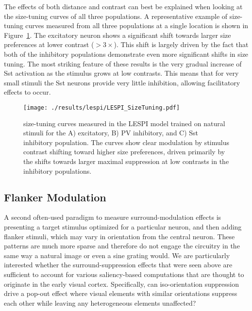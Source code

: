 The effects of both distance and contrast can best be
explained when looking at the size-tuning curves of all three
populations. A representative example of size-tuning curves measured
from all three populations at a single location is shown in
Figure~\ref{LESPI_SizeTuning}. The excitatory neuron shows a
significant shift towards larger size preferences at lower contrast
($>3\times$). This shift is largely driven by the fact that both of
the inhibitory populations demonstrate even more significant shifts in size
tuning. The most striking feature of these results is the very gradual increase
of Sst activation as the stimulus grows at low contrasts. This means
that for very small stimuli the Sst neurons provide very little
inhibition, allowing facilitatory effects to occur.

\begin{figure}
	\centering
        \texttt{[image: ./results/lespi/LESPI\_SizeTuning.pdf]}
	\caption[size-tuning curves of the excitatory, PV, and Sst
      population at various contrasts.]{size-tuning curves measured in
      the LESPI model trained on natural stimuli for the A)
      excitatory, B) PV inhibitory, and C) Sst inhibitory
      population. The curves show clear modulation by stimulus
      contrast shifting toward higher size preferences, driven
      primarily by the shifts towards larger maximal suppression at
      low contrasts in the inhibitory populations.}
	\label{LESPI_SizeTuning}
\end{figure}

\subsection{Flanker Modulation}

A second often-used paradigm to measure surround-modulation effects is
presenting a target stimulus optimized for a particular neuron, and
then adding flanker stimuli, which may vary in orientation from the
central neuron. These patterns are much more sparse and therefore do
not engage the circuitry in the same way a natural image or
even a sine grating would. We are particularly interested
whether the surround-suppression effects that were seen above are
sufficient to account for various saliency-based computations that are
thought to originate in the early visual cortex. Specifically, can
iso-orientation suppression drive a pop-out effect where visual
elements with similar orientations suppress each other while
leaving any heterogeneous elements unaffected?

